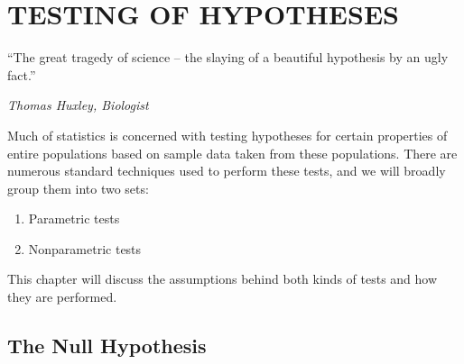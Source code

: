 %
\chapter{TESTING OF HYPOTHESES}
\label{ch:testing}
\epigraph{``The great tragedy of science -- the slaying of a beautiful hypothesis by an ugly fact.''}{\textit{Thomas Huxley, Biologist}}

Much of statistics is concerned with testing hypotheses for certain properties of entire populations
based on sample data taken from these populations.  There are numerous standard 
techniques used to perform these tests, and we will broadly group them into two sets:
\begin{enumerate}
	\item Parametric tests
	\item Nonparametric tests
\end{enumerate}
This chapter will discuss the assumptions behind both kinds of tests and how they are performed.

\section{The Null Hypothesis}

